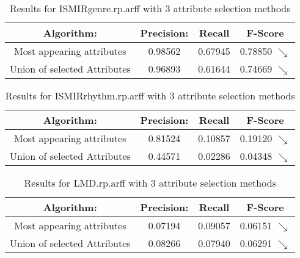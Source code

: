 \begin{table}[p]
\begin{center}
\begin{tabular}{|c|c|c|c|}
\hline Algorithm: & Precision: & Recall & F-Score\\
\hline Most appearing attributes & 0.98562 & 0.67945 & 0.78850 $\searrow$\\
\hline Union of selected Attributes & 0.96893 & 0.61644 & 0.74669 $\searrow$\\

\hline
\end{tabular}
\caption{Results for ISMIRgenre.rp.arff with 3 attribute selection methods}
\label{table:classifier:ISMIRgenre3}
\end{center}
\end{table}


\begin{table}[p]
\begin{center}
\begin{tabular}{|c|c|c|c|}
\hline Algorithm: & Precision: & Recall & F-Score\\
\hline Most appearing attributes & 0.81524 & 0.10857 & 0.19120 $\searrow$\\
\hline Union of selected Attributes & 0.44571 & 0.02286 & 0.04348 $\searrow$\\

\hline
\end{tabular}
\caption{Results for ISMIRrhythm.rp.arff with 3 attribute selection methods}
\label{table:classifier:ISMIRrhythm3}
\end{center}
\end{table}


\begin{table}[p]
\begin{center}
\begin{tabular}{|c|c|c|c|}
\hline Algorithm: & Precision: & Recall & F-Score\\
\hline Most appearing attributes & 0.07194 & 0.09057 & 0.06151 $\searrow$\\
\hline Union of selected Attributes & 0.08266 & 0.07940 & 0.06291 $\searrow$\\

\hline
\end{tabular}
\caption{Results for LMD.rp.arff with 3 attribute selection methods}
\label{table:classifier:LMD3}
\end{center}
\end{table}






